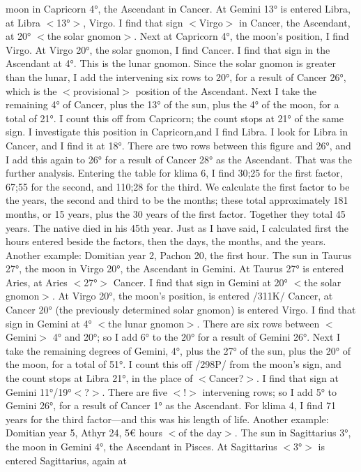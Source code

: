 moon in Capricorn 4°, the Ascendant in Cancer. At Gemini 13° is entered Libra, at Libra $<$13°$>$, Virgo.
I find that sign $<$Virgo$>$ in Cancer, the Ascendant, at 20° $<$the solar gnomon$>$. Next at Capricorn 4°, the
moon’s position, I find Virgo. At Virgo 20°, the solar gnomon, I find Cancer. I find that sign in the
Ascendant at 4°. This is the lunar gnomon. Since the solar gnomon is greater than the lunar, I add the
intervening six rows to 20°, for a result of Cancer 26°, which is the $<$provisional$>$ position of the
Ascendant. Next I take the remaining 4° of Cancer, plus the 13° of the sun, plus the 4° of the moon, for a
total of 21°. I count this off from Capricorn; the count stops at 21° of the same sign. I investigate this
position in Capricorn,and I find Libra. I look for Libra in Cancer, and I find it at 18°. There are two rows
between this figure and 26°, and I add this again to 26° for a result of Cancer 28° as the Ascendant. That
was the further analysis. Entering the table for klima 6, I find 30;25 for the first factor, 67;55 for the
second, and 110;28 for the third. We calculate the first factor to be the years, the second and third to be the months; these total approximately 181 months, or 15 years, plus the 30 years of the first factor. Together
they total 45 years. The native died in his 45th year. Just as I have said, I calculated first the hours entered
beside the factors, then the days, the months, and the years.
Another example: Domitian year 2, Pachon 20, the first hour. The sun in Taurus 27°, the moon in
Virgo 20°, the Ascendant in Gemini. At Taurus 27° is entered Aries, at Aries $<$27°$>$ Cancer. I find that
sign in Gemini at 20° $<$the solar gnomon$>$. At Virgo 20°, the moon’s position, is entered /311K/ Cancer,
at Cancer 20° (the previously determined solar gnomon) is entered Virgo. I find that sign in Gemini at 4°
$<$the lunar gnomon$>$. There are six rows between $<$Gemini$>$ 4° and 20°; so I add 6° to the 20° for a result
of Gemini 26°. Next I take the remaining degrees of Gemini, 4°, plus the 27° of the sun, plus the 20° of
the moon, for a total of 51°. I count this off /298P/ from the moon’s sign, and the count stops at Libra
21°, in the place of $<$Cancer?$>$. I find that sign at Gemini 11°/19°$<$?$>$. There are five $<$!$>$ intervening
rows; so I add 5° to Gemini 26°, for a result of Cancer 1° as the Ascendant. For klima 4, I find 71 years
for the third factor—and this was his length of life.
Another example: Domitian year 5, Athyr 24, 5€ hours $<$of the day$>$. The sun in Sagittarius 3°, the
moon in Gemini 4°, the Ascendant in Pisces. At Sagittarius $<$3°$>$ is entered Sagittarius, again at
